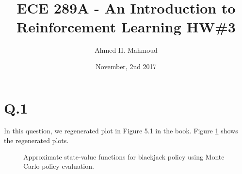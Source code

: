 \documentclass[12pt] {article}
\begin{document}
\title{ECE 289A - An Introduction to Reinforcement Learning HW\#3}

\author{Ahmed H. Mahmoud}
\date{November, 2nd 2017} 
\maketitle
\section*{Q.1}
In this question, we regenerated plot in Figure 5.1 in the book. Figure \ref{fig:b} shows the regenerated plots.

\begin{figure}[!tbh]
\centering        
        
      
   \caption{Approximate state-value functions for blackjack policy using Monte Carlo policy evaluation. }
   \label{fig:b}
\end{figure}
\end{document}
